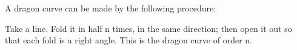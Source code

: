  A dragon curve can be made by the following procedure:
\par
Take a line. Fold it in half n times, in the 
same direction; then open it out so that each fold 
is a right angle. This is the dragon curve of order n.
